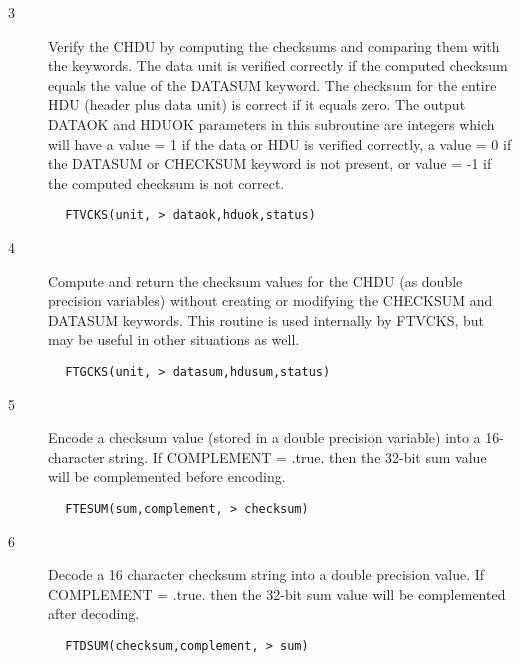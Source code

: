 \documentclass[11pt]{book}
\begin{document}
\begin{description}
\item[3 ] Verify the CHDU by computing the checksums and comparing
    them with the keywords.  The data unit is verified correctly
    if the computed checksum equals the value of the DATASUM
    keyword.  The checksum for the entire HDU (header plus data unit) is
    correct if it equals zero.  The output DATAOK and HDUOK parameters
    in this subroutine are integers which will have a value = 1
    if the data or HDU is verified correctly, a value = 0
    if the DATASUM or CHECKSUM keyword is not present, or value = -1
   if the computed checksum is not correct.
\end{description}

\begin{verbatim}
        FTVCKS(unit, > dataok,hduok,status)
\end{verbatim}

\begin{description}
\item[4 ] Compute and return the checksum values for the CHDU (as
    double precision variables) without creating or modifying the
    CHECKSUM and DATASUM keywords.  This routine is used internally by
   FTVCKS, but may be useful in other situations as well.
\end{description}

\begin{verbatim}
        FTGCKS(unit, > datasum,hdusum,status)
\end{verbatim}

\begin{description}
\item[5 ] Encode a checksum value (stored in a double precision variable)
    into a 16-character string.  If COMPLEMENT = .true. then the 32-bit
   sum value will be complemented before encoding.
\end{description}

\begin{verbatim}
        FTESUM(sum,complement, > checksum)
\end{verbatim}

\begin{description}
\item[6 ] Decode a 16 character checksum string into a double precision value.
    If COMPLEMENT = .true. then the 32-bit sum value will be complemented
   after decoding.
\end{description}

\begin{verbatim}
        FTDSUM(checksum,complement, > sum)
\end{verbatim}

\end{document}
